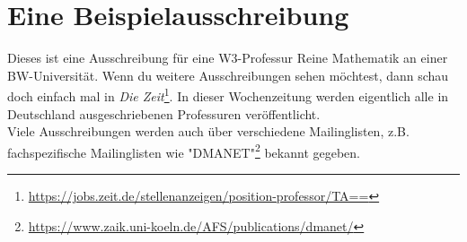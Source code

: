 \chapter{Eine Beispielausschreibung}\thispagestyle{fancy}\label{chp:beispielausschreibung}
Dieses ist eine Ausschreibung für eine W3-Professur Reine Mathematik an einer BW-Universität. Wenn du weitere Ausschreibungen sehen möchtest, dann schau doch einfach mal in \emph{Die Zeit}\footnote{\url{https://jobs.zeit.de/stellenanzeigen/position-professor/TA==}}.  In dieser Wochenzeitung werden eigentlich alle in Deutschland ausgeschriebenen Professuren veröffentlicht.\\

Viele Ausschreibungen werden auch über verschiedene Mailinglisten, z.B. fachspezifische Mailinglisten wie "DMANET"\footnote{\url{https://www.zaik.uni-koeln.de/AFS/publications/dmanet/}} bekannt gegeben.
\clearpage{}

